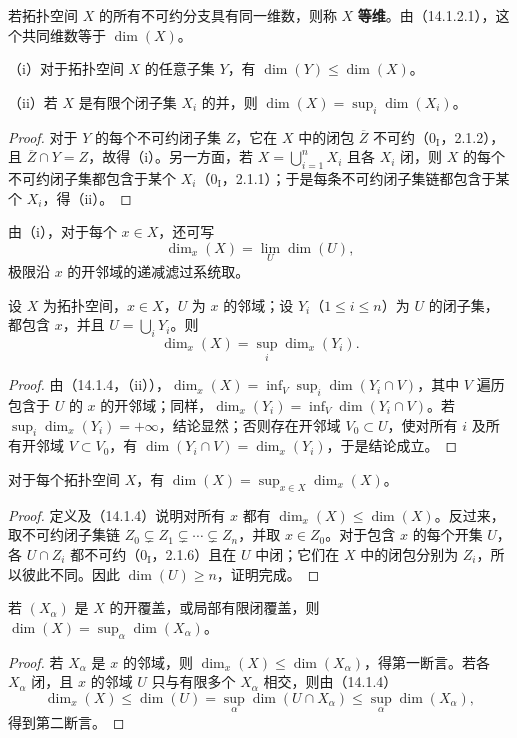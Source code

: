 若拓扑空间 $X$ 的所有不可约分支具有同一维数，则称 $X$ \textbf{等维}。由（14.1.2.1），这个共同维数等于 $\dim(X)$。

（i）对于拓扑空间 $X$ 的任意子集 $Y$，有 $\dim(Y)\leq\dim(X)$。

（ii）若 $X$ 是有限个闭子集 $X_i$ 的并，则 $\dim(X)=\sup_i\dim(X_i)$。
\begin{proof}
对于 $Y$ 的每个不可约闭子集 $Z$，它在 $X$ 中的闭包 $\overline Z$ 不可约（$0_{\mathrm I}$，2.1.2），且 $\overline Z\cap Y=Z$，故得（i）。另一方面，若 $X=\bigcup_{i=1}^nX_i$ 且各 $X_i$ 闭，则 $X$ 的每个不可约闭子集都包含于某个 $X_i$（$0_{\mathrm I}$，2.1.1）；于是每条不可约闭子集链都包含于某个 $X_i$，得（ii）。
\end{proof}
由（i），对于每个 $x\in X$，还可写
\begin{equation}
 \dim_x(X)=\lim_U\dim(U),\tag{14.1.4.1}
\end{equation}
极限沿 $x$ 的开邻域的递减滤过系统取。

设 $X$ 为拓扑空间，$x\in X$，$U$ 为 $x$ 的邻域；设 $Y_i$（$1\leq i\leq n$）为 $U$ 的闭子集，都包含 $x$，并且 $U=\bigcup_iY_i$。则
\begin{equation}
 \dim_x(X)=\sup_i\dim_x(Y_i).\tag{14.1.5.1}
\end{equation}
\begin{proof}
由（14.1.4，（ii）），$\dim_x(X)=\inf_V\sup_i\dim(Y_i\cap V)$，其中 $V$ 遍历包含于 $U$ 的 $x$ 的开邻域；同样，$\dim_x(Y_i)=\inf_V\dim(Y_i\cap V)$。若 $\sup_i\dim_x(Y_i)=+\infty$，结论显然；否则存在开邻域 $V_0\subset U$，使对所有 $i$ 及所有开邻域 $V\subset V_0$，有 $\dim(Y_i\cap V)=\dim_x(Y_i)$，于是结论成立。
\end{proof}

对于每个拓扑空间 $X$，有 $\dim(X)=\sup_{x\in X}\dim_x(X)$。
\begin{proof}
定义及（14.1.4）说明对所有 $x$ 都有 $\dim_x(X)\leq\dim(X)$。反过来，取不可约闭子集链 $Z_0\subsetneq Z_1\subsetneq\cdots\subsetneq Z_n$，并取 $x\in Z_0$。对于包含 $x$ 的每个开集 $U$，各 $U\cap Z_i$ 都不可约（$0_{\mathrm I}$，2.1.6）且在 $U$ 中闭；它们在 $X$ 中的闭包分别为 $Z_i$，所以彼此不同。因此 $\dim(U)\geq n$，证明完成。
\end{proof}

若 $(X_\alpha)$ 是 $X$ 的开覆盖，或局部有限闭覆盖，则
$\dim(X)=\sup_\alpha\dim(X_\alpha)$。
\begin{proof}
若 $X_\alpha$ 是 $x$ 的邻域，则 $\dim_x(X)\leq\dim(X_\alpha)$，得第一断言。若各 $X_\alpha$ 闭，且 $x$ 的邻域 $U$ 只与有限多个 $X_\alpha$ 相交，则由（14.1.4）
\[
 \dim_x(X)\leq\dim(U)=\sup_\alpha\dim(U\cap X_\alpha)
 \leq\sup_\alpha\dim(X_\alpha),
\]
得到第二断言。
\end{proof}

